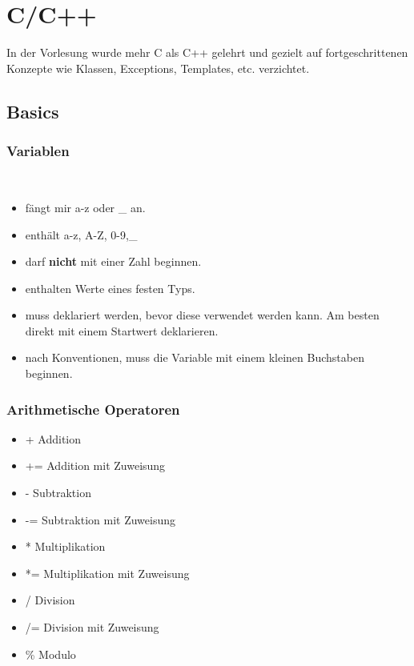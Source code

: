 \chapter{C/C++}
\label{sec:C/C++}
In der Vorlesung wurde mehr C als C++ gelehrt und gezielt auf fortgeschrittenen Konzepte wie Klassen, Exceptions, Templates, etc. verzichtet. 
\section{Basics}
\subsection{Variablen}\qquad\\
\begin{itemize}
	\item fängt mir a-z oder \_ an.
	\item enthält a-z, A-Z, 0-9,\_
	\item darf \textbf{nicht} mit einer Zahl beginnen. 
	\item enthalten Werte eines festen Typs.
	\item muss deklariert werden, bevor diese verwendet werden kann. Am besten direkt mit einem Startwert deklarieren.
	\item nach Konventionen, muss die Variable mit einem kleinen Buchstaben beginnen. 
\end{itemize}
\subsection{Arithmetische Operatoren}
\begin{itemize}
	\item + Addition
	\item += Addition mit Zuweisung
	\item - Subtraktion
	\item -= Subtraktion mit Zuweisung
	\item * Multiplikation
	\item *= Multiplikation mit Zuweisung
	\item / Division
	\item /= Division mit Zuweisung
	\item \% Modulo
\end{itemize}
